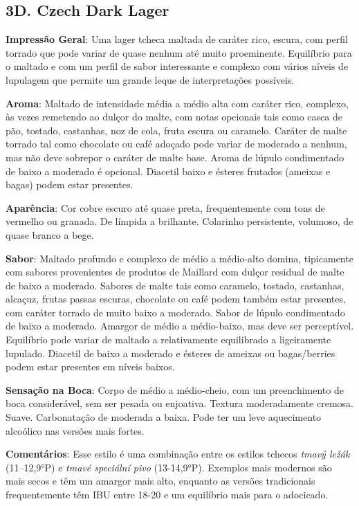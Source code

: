 \subsection*{3D. Czech Dark Lager}
\textbf{Impressão Geral}: Uma lager tcheca maltada de caráter rico, escura, com perfil torrado que pode variar de quase nenhum até muito proeminente. Equilíbrio para o maltado e com um perfil de sabor interessante e complexo com vários níveis de lupulagem que permite um grande leque de interpretações possíveis.

\textbf{Aroma}: Maltado de intensidade média a médio alta com caráter rico, complexo, às vezes remetendo ao dulçor do malte, com notas opcionais tais como casca de pão, tostado, castanhas, noz de cola, fruta escura ou caramelo. Caráter de malte torrado tal como chocolate ou café adoçado pode variar de moderado a nenhum, mas não deve sobrepor o caráter de malte base. Aroma de lúpulo condimentado de baixo a moderado é opcional. Diacetil baixo e ésteres frutados (ameixas e bagas) podem estar presentes.

\textbf{Aparência}: Cor cobre escuro até quase preta, frequentemente com tons de vermelho ou granada. De límpida a brilhante. Colarinho persistente, volumoso, de quase branco a bege.

\textbf{Sabor}: Maltado profundo e complexo de médio a médio-alto domina, tipicamente com sabores provenientes de produtos de Maillard com dulçor residual de malte de baixo a moderado. Sabores de malte tais como caramelo, tostado, castanhas, alcaçuz, frutas passas escuras, chocolate ou café podem também estar presentes, com caráter torrado de muito baixo a moderado. Sabor de lúpulo condimentado de baixo a moderado. Amargor de médio a médio-baixo, mas deve ser perceptível. Equilíbrio pode variar de maltado a relativamente equilibrado a ligeiramente lupulado. Diacetil de baixo a moderado e ésteres de ameixas ou bagas/berries podem estar presentes em níveis baixos.

\textbf{Sensação na Boca}: Corpo de médio a médio-cheio, com um preenchimento de boca considerável, sem ser pesada ou enjoativa. Textura moderadamente cremosa. Suave. Carbonatação de moderada a baixa. Pode ter um leve aquecimento alcoólico nas versões mais fortes.

\textbf{Comentários}: Esse estilo é uma combinação entre os estilos tchecos \textit{tmavý ležák} (11–12,9°P) e \textit{tmavé speciální pivo} (13-14,9°P). Exemplos mais modernos são mais secos e têm um amargor mais alto, enquanto as versões tradicionais frequentemente têm IBU entre 18-20 e um equilíbrio mais para o adocicado.

